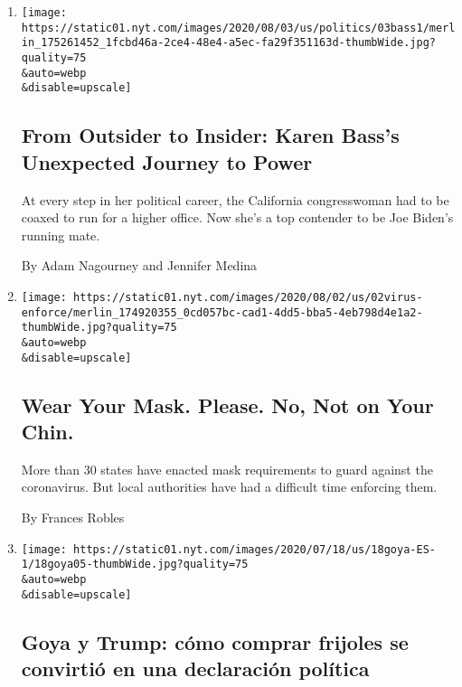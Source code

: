 \begin{enumerate}
\def\labelenumi{\arabic{enumi}.}
\item
  \href{/2020/08/04/us/politics/karen-bass-vice-president-biden.html}{}

  \texttt{[image: https://static01.nyt.com/images/2020/08/03/us/politics/03bass1/merlin\_175261452\_1fcbd46a-2ce4-48e4-a5ec-fa29f351163d-thumbWide.jpg?quality=75\\\&auto=webp\\\&disable=upscale]}

  \hypertarget{from-outsider-to-insider-karen-basss-unexpected-journey-to-power}{%
  \subsection{From Outsider to Insider: Karen Bass's Unexpected Journey
  to
  Power}\label{from-outsider-to-insider-karen-basss-unexpected-journey-to-power}}

  At every step in her political career, the California congresswoman
  had to be coaxed to run for a higher office. Now she's a top contender
  to be Joe Biden's running mate.

  By Adam Nagourney and Jennifer Medina
\item
  \href{/2020/07/31/us/coronavirus-masks-enforcement-key-west.html}{}

  \texttt{[image: https://static01.nyt.com/images/2020/08/02/us/02virus-enforce/merlin\_174920355\_0cd057bc-cad1-4dd5-bba5-4eb798d4e1a2-thumbWide.jpg?quality=75\\\&auto=webp\\\&disable=upscale]}

  \hypertarget{wear-your-mask-please-no-not-on-your-chin}{%
  \subsection{Wear Your Mask. Please. No, Not on Your
  Chin.}\label{wear-your-mask-please-no-not-on-your-chin}}

  More than 30 states have enacted mask requirements to guard against
  the coronavirus. But local authorities have had a difficult time
  enforcing them.

  By Frances Robles
\item
  \href{/es/2020/07/19/espanol/goya-boicot-trump.html}{}

  \texttt{[image: https://static01.nyt.com/images/2020/07/18/us/18goya-ES-1/18goya05-thumbWide.jpg?quality=75\\\&auto=webp\\\&disable=upscale]}

  \hypertarget{goya-y-trump-cuxf3mo-comprar-frijoles-se-convirtiuxf3-en-una-declaraciuxf3n-poluxedtica}{%
  \subsection{Goya y Trump: cómo comprar frijoles se convirtió en una
  declaración
  política}\label{goya-y-trump-cuxf3mo-comprar-frijoles-se-convirtiuxf3-en-una-declaraciuxf3n-poluxedtica}}


\end{enumerate}
